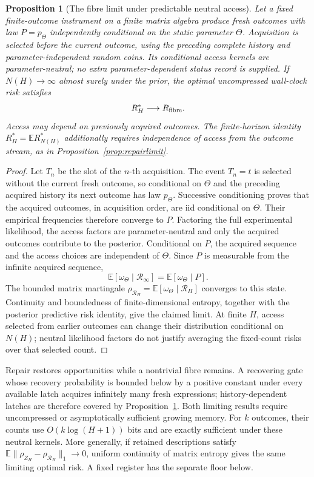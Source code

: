 \documentclass[12pt]{article}
\newtheorem{proposition}[theorem]{Proposition}
\theoremstyle{definition}
\theoremstyle{remark}
\newcommand{\E}{\mathbb E}
\begin{document}
\begin{proposition}[The fibre limit under predictable neutral access]
\label{prop:neutral_limit}
Let a fixed finite-outcome instrument on a finite matrix algebra produce
fresh outcomes with law $P=p_\Theta$ independently conditional on the static
parameter $\Theta$. Acquisition is selected before the current outcome,
using the preceding complete history and parameter-independent random
coins. Its conditional access kernels are parameter-neutral; no extra
parameter-dependent status record is supplied. If $N(H)\to\infty$ almost
surely under the prior, the optimal uncompressed wall-clock risk satisfies
\[
 R_H^*\longrightarrow R_{\rm fibre}.
\]
Access may depend on previously acquired outcomes. The finite-horizon
identity $R_H^*=\E R_{N(H)}^*$ additionally requires independence of access
from the outcome stream, as in Proposition~\ref{prop:repairlimit}.
\end{proposition}
\begin{proof}
Let $T_n$ be the slot of the $n$-th acquisition. The event $T_n=t$ is
selected without the current fresh outcome, so conditional on $\Theta$
and the preceding acquired history its next outcome has law $p_\Theta$.
Successive conditioning proves that the acquired outcomes, in acquisition
order, are iid conditional on $\Theta$. Their empirical frequencies
therefore converge to $P$. Factoring the full experimental likelihood,
the access factors are parameter-neutral and only the acquired outcomes
contribute to the posterior. Conditional on $P$, the acquired sequence and
the access choices are independent of $\Theta$. Since $P$ is measurable
from the infinite acquired sequence,
\[
 \E[\omega_\Theta\mid\mathcal R_\infty]
 =\E[\omega_\Theta\mid P].
\]
The bounded matrix martingale
$\rho_{\mathcal R_H}=\E[\omega_\Theta\mid\mathcal R_H]$ converges to this
state. Continuity and boundedness of finite-dimensional entropy, together
with the posterior predictive risk identity, give the claimed limit.
At finite $H$, access selected from earlier outcomes can change their
distribution conditional on $N(H)$; neutral likelihood factors do not
justify averaging the fixed-count risks over that selected count.
\end{proof}

Repair restores opportunities while a nontrivial fibre remains. A
recovering gate whose recovery probability is bounded below by a positive
constant under every available latch acquires infinitely many fresh
expressions; history-dependent latches are therefore covered by
Proposition~\ref{prop:neutral_limit}. Both limiting results require
uncompressed or asymptotically sufficient growing memory. For $k$
outcomes, their counts use $O(k\log(H+1))$ bits and are exactly sufficient
under these neutral kernels. More generally, if retained descriptions
satisfy $\E\|\rho_{Z_H}-\rho_{\mathcal R_H}\|_1\to0$, uniform continuity of
matrix entropy gives the same limiting optimal risk. A fixed register has
the separate floor below.
\end{document}
